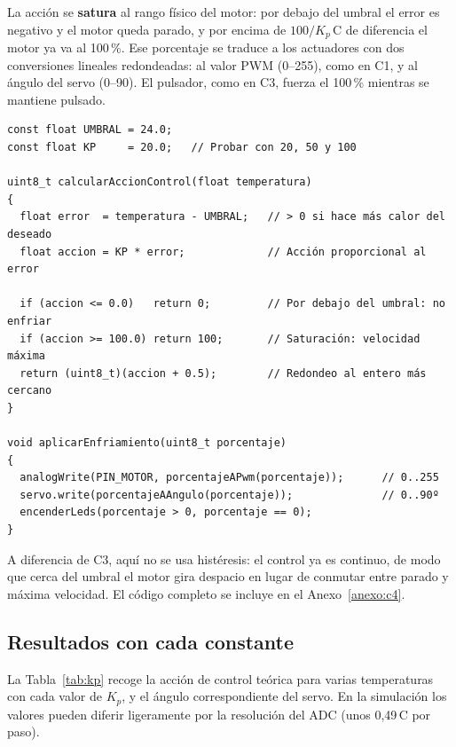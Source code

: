 \documentclass{upo-master}
\begin{document}
La acción se \textbf{satura} al rango físico del motor: por debajo del umbral
el error es negativo y el motor queda parado, y por encima de
$100/K_p$\,\textdegree C de diferencia el motor ya va al 100\,\%. Ese
porcentaje se traduce a los actuadores con dos conversiones lineales
redondeadas: al valor PWM (0--255), como en C1, y al ángulo del servo
(0--90\textdegree). El pulsador, como en C3, fuerza el 100\,\% mientras se
mantiene pulsado.

\begin{lstlisting}[style=arduino, caption={Cálculo de la acción de control proporcional.}]
const float UMBRAL = 24.0;
const float KP     = 20.0;   // Probar con 20, 50 y 100

uint8_t calcularAccionControl(float temperatura)
{
  float error  = temperatura - UMBRAL;   // > 0 si hace más calor del deseado
  float accion = KP * error;             // Acción proporcional al error

  if (accion <= 0.0)   return 0;         // Por debajo del umbral: no enfriar
  if (accion >= 100.0) return 100;       // Saturación: velocidad máxima
  return (uint8_t)(accion + 0.5);        // Redondeo al entero más cercano
}

void aplicarEnfriamiento(uint8_t porcentaje)
{
  analogWrite(PIN_MOTOR, porcentajeAPwm(porcentaje));      // 0..255
  servo.write(porcentajeAAngulo(porcentaje));              // 0..90º
  encenderLeds(porcentaje > 0, porcentaje == 0);
}
\end{lstlisting}

A diferencia de C3, aquí no se usa histéresis: el control ya es continuo, de
modo que cerca del umbral el motor gira despacio en lugar de conmutar entre
parado y máxima velocidad. El código completo se incluye en el
Anexo~\ref{anexo:c4}.

\subsection{Resultados con cada constante}

La Tabla~\ref{tab:kp} recoge la acción de control teórica para varias
temperaturas con cada valor de $K_p$, y el ángulo correspondiente del servo.
En la simulación los valores pueden diferir ligeramente por la resolución del
ADC (unos 0,49\,\textdegree C por paso).
\end{document}

